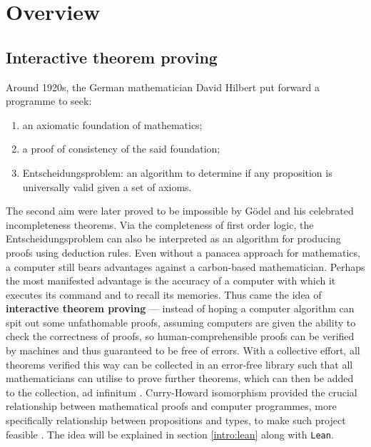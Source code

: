 \documentclass{report}
\theoremstyle{definition}
\begin{document}
\tableofcontents

\chapter{Overview}
\section{Interactive theorem proving}
Around 1920s, the German mathematician David Hilbert put forward a programme to seek:
\begin{enumerate}
  \item an axiomatic foundation of mathematics;
  \item a proof of consistency of the said foundation;
  \item Entscheidungsproblem: an algorithm to determine if any proposition is universally valid given a set of axioms.
\end{enumerate}
The second aim were later proved to be impossible by Gödel and his celebrated incompleteness theorems. Via the completeness of first order logic, the Entscheidungsproblem can also be interpreted as an algorithm for producing proofs using deduction rules. Even without a panacea approach for mathematics, a computer still bears advantages against a carbon-based mathematician. Perhaps the most manifested advantage is the accuracy of a computer with which it executes its command and to recall its memories. Thus came the idea of {\bf interactive theorem proving} --- instead of hoping a computer algorithm can spit out some unfathomable proofs, assuming computers are given the ability to check the correctness of proofs, so human-comprehensible proofs can be verified by machines and thus guaranteed to be free of errors. With a collective effort, all theorems verified this way can be collected in an error-free library such that all mathematicians can utilise to prove further theorems, which can then be added to the collection, ad infinitum \cite{boyer1994qed}. Curry-Howard isomorphism provided the crucial relationship between mathematical proofs and computer programmes, more specifically relationship between propositions and types, to make such project feasible \cite{kennedy2011set}. The idea will be explained in section \ref{intro:lean} along with {\tt \small Lean}. 
\end{document}
